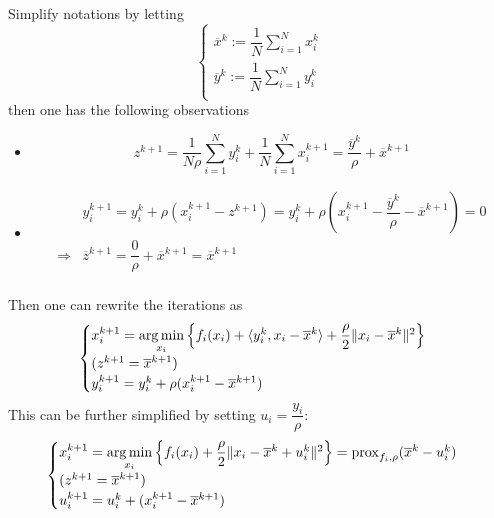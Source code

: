Simplify notations by letting
$$
\begin{cases}
\overline{x}^k := \dfrac{1}{N} \sum\limits_{i=1}^N x_i^k \\
\overline{y}^k := \dfrac{1}{N} \sum\limits_{i=1}^N y_i^k \\
\end{cases}
$$
then one has the following observations
\begin{itemize}
    \item $$\displaystyle z^{k+1} = \dfrac{1}{N\rho} \sum\limits_{i=1}^N y_i^k + \dfrac{1}{N} \sum\limits_{i=1}^N x_i^{k+1} = \dfrac{\overline{y}^k}{\rho} + \overline{x}^{k+1}$$
    \item \begin{align*}
        & y^{k+1}_i = y_i^k + \rho(x_i^{k+1}-z^{k+1}) = y_i^k + \rho(x_i^{k+1}-\dfrac{\overline{y}^k}{\rho} - \overline{x}^{k+1}) = 0 \\
        \Rightarrow & \overline{z}^{k+1} = \dfrac{0}{\rho} + \overline{x}^{k+1} = \overline{x}^{k+1} \\
    \end{align*}
\end{itemize}
Then one can rewrite the iterations as
$$
\begin{cases}
x^{k+1}_i = \operatorname*{arg\,min}\limits_{x_i} \left\{ f_i(x_i) + \langle y_i^k, x_i-\overline{x}^k \rangle + \dfrac{\rho}{2}\lVert x_i-\overline{x}^k \rVert^2 \right\} \\
(z^{k+1} = \overline{x}^{k+1}) \\
y_i^{k+1} = y_i^k + \rho(x^{k+1}_i-\overline{x}^{k+1})
\end{cases}
$$
This can be further simplified by setting $u_i = \dfrac{y_i}{\rho}$:
$$
\begin{cases}
x^{k+1}_i = \operatorname*{arg\,min}\limits_{x_i} \left\{ f_i(x_i) + \dfrac{\rho}{2}\lVert x_i-\overline{x}^k + u_i^k \rVert^2 \right\} = \operatorname{prox}_{f_i,\rho}(\overline{x}^k - u_i^k) \\
(z^{k+1} = \overline{x}^{k+1}) \\
u_i^{k+1} = u_i^k + (x^{k+1}_i-\overline{x}^{k+1})
\end{cases}
$$

